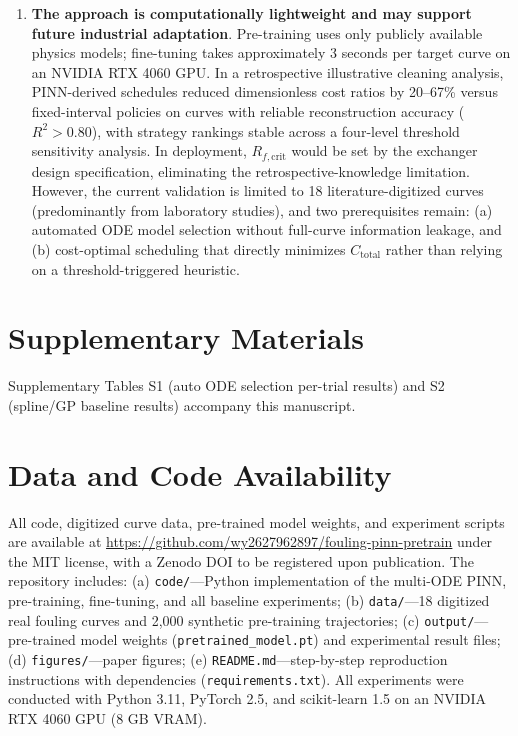 \documentclass[review]{elsarticle}
\begin{document}
\begin{enumerate}
\item \textbf{The approach is computationally lightweight and may support future industrial adaptation}. Pre-training uses only publicly available physics models; fine-tuning takes approximately 3 seconds per target curve on an NVIDIA RTX 4060 GPU. In a retrospective illustrative cleaning analysis, PINN-derived schedules reduced dimensionless cost ratios by 20--67\% versus fixed-interval policies on curves with reliable reconstruction accuracy ($R^2 > 0.80$), with strategy rankings stable across a four-level threshold sensitivity analysis. In deployment, $R_{f,\text{crit}}$ would be set by the exchanger design specification, eliminating the retrospective-knowledge limitation. However, the current validation is limited to 18 literature-digitized curves (predominantly from laboratory studies), and two prerequisites remain: (a) automated ODE model selection without full-curve information leakage, and (b) cost-optimal scheduling that directly minimizes $C_{\text{total}}$ rather than relying on a threshold-triggered heuristic.
\end{enumerate}

\section*{Supplementary Materials}

Supplementary Tables S1 (auto ODE selection per-trial results) and S2 (spline/GP baseline results) accompany this manuscript.

\section*{Data and Code Availability}

All code, digitized curve data, pre-trained model weights, and experiment scripts are available at \url{https://github.com/wy2627962897/fouling-pinn-pretrain} under the MIT license, with a Zenodo DOI to be registered upon publication. The repository includes: (a) \texttt{code/}---Python implementation of the multi-ODE PINN, pre-training, fine-tuning, and all baseline experiments; (b) \texttt{data/}---18 digitized real fouling curves and 2,000 synthetic pre-training trajectories; (c) \texttt{output/}---pre-trained model weights (\texttt{pretrained\_model.pt}) and experimental result files; (d) \texttt{figures/}---paper figures; (e) \texttt{README.md}---step-by-step reproduction instructions with dependencies (\texttt{requirements.txt}). All experiments were conducted with Python 3.11, PyTorch 2.5, and scikit-learn 1.5 on an NVIDIA RTX 4060 GPU (8 GB VRAM).
\end{document}
